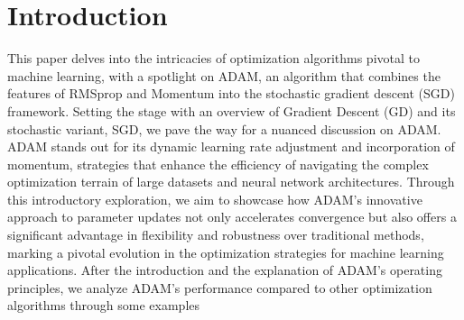 \documentclass[oneside]{article}
\begin{document}
\newpage

\tableofcontents 
\vspace{1.5cm}




\newpage
\section{Introduction}
This paper delves into the intricacies of optimization algorithms pivotal to machine learning, with a spotlight on ADAM, an algorithm that combines the features of RMSprop and Momentum into the stochastic gradient descent (SGD) framework. Setting the stage with an overview of Gradient Descent (GD) and its stochastic variant, SGD, we pave the way for a nuanced discussion on ADAM. ADAM stands out for its dynamic learning rate adjustment and incorporation of momentum, strategies that enhance the efficiency of navigating the complex optimization terrain of large datasets and neural network architectures. Through this introductory exploration, we aim to showcase how ADAM's innovative approach to parameter updates not only accelerates convergence but also offers a significant advantage in flexibility and robustness over traditional methods, marking a pivotal evolution in the optimization strategies for machine learning applications. After the introduction and the explanation of ADAM's operating principles, we analyze ADAM's performance compared to other optimization algorithms through some examples 
\end{document}
